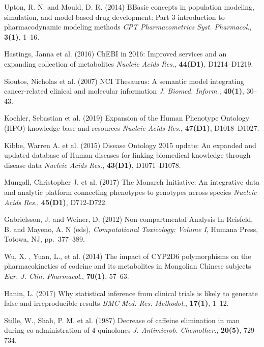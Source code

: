 \documentclass[a4,center,fleqn]{NAR}
\begin{document}
\begin{thebibliography}{4}
Upton, R. N. and Mould, D. R. (2014)
BBasic concepts in population modeling, simulation, and model-based drug development: Part 3-introduction to pharmacodynamic modeling methods
\textit{ CPT Pharmacometrics Syst. Pharmacol.}, \textbf{3(1)}, 1--16.

Hastings, Janna et al.  (2016)
ChEBI in 2016: Improved services and an expanding collection of metabolites
\textit{Nucleic Acids Res.}, \textbf{44(D1)}, D1214--D1219.

Sioutos, Nicholas et al.  (2007)
NCI Thesaurus: A semantic model integrating cancer-related clinical and molecular information
\textit{J. Biomed. Inform.}, \textbf{40(1)}, 30--43.

Koehler, Sebastian et al. (2019)
Expansion of the Human Phenotype Ontology (HPO) knowledge base and resources
\textit{Nucleic Acids Res.}, \textbf{47(D1)}, D1018--D1027.

Kibbe, Warren A. et al. (2015)
Disease Ontology 2015 update: An expanded and updated database of Human diseases for linking biomedical knowledge through disease data
\textit{Nucleic Acids Res.}, \textbf{43(D1)}, D1071--D1078.


Mungall, Christopher J. et al. (2017)
The Monarch Initiative: An integrative data and analytic platform connecting phenotypes to genotypes across species
\textit{Nucleic Acids Res.}, \textbf{45(D1)}, D712-D722.

Gabrielsson, J. and Weiner, D. (2012)
Non-compartmental Analysis
In
Reisfeld, B. and Mayeno, A. N (eds),
\textit{Computational Toxicology: Volume I},
Humana Press, Totowa, NJ,
pp.\ 377--389.

Wu, X. , Yuan, L., et al. (2014)
The impact of CYP2D6 polymorphisms on the pharmacokinetics of codeine and its metabolites in Mongolian Chinese subjects
\textit{Eur. J. Clin. Pharmacol.}, \textbf{70(1)}, 57--63.

Hanin, L. (2017)
Why statistical inference from clinical trials is likely to generate false and irreproducible results
\textit{BMC Med. Res. Methodol.}, \textbf{17(1)}, 1--12.

Stille, W., Shah, P. M. et al. (1987)
Decrease of caffeine elimination in man during co-administration of 4-quinolones
\textit{J. Antimicrob. Chemother.}, \textbf{20(5)}, 729--734.





\end{thebibliography}
\end{document}
